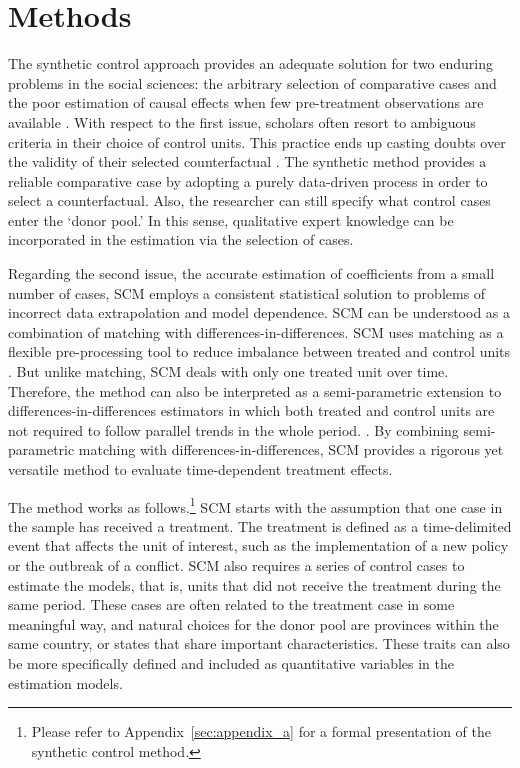 \section{Methods}
\label{sec:methods}

The synthetic control approach provides an adequate solution for two enduring problems in the social sciences: the arbitrary selection of comparative cases and the poor estimation of causal effects when few pre-treatment observations are available \citep{abadie2003, abadie2010}. With respect to the first issue, scholars often resort to ambiguous criteria in their choice of control units. This practice ends up casting doubts over the validity of their selected counterfactual \citep{abadie2011}. The synthetic method provides a reliable comparative case by adopting a purely data-driven process in order to select a counterfactual. Also, the researcher can still specify what control cases enter the `donor pool.' In this sense, qualitative expert knowledge can be incorporated in the estimation via the selection of cases. 

Regarding the second issue, the accurate estimation of coefficients from a small number of cases, SCM employs a consistent statistical solution to problems of incorrect data extrapolation and model dependence. SCM can be understood as a combination of matching with differences-in-differences. SCM uses matching as a flexible pre-processing tool to reduce imbalance between treated and control units \citep{ho2007matching, rubin1973matching, rubin2006matched}. But unlike matching, SCM deals with only one treated unit over time. Therefore, the method can also be interpreted as a semi-parametric extension to differences-in-differences estimators in which both treated and control units are not required to follow parallel trends in the whole period. \citep{abadie2005semiparametric}. By combining semi-parametric matching with differences-in-differences, SCM provides a rigorous yet versatile method to evaluate time-dependent treatment effects. 

The method works as follows.\footnote{Please refer to Appendix~\ref{sec:appendix_a} for a formal presentation of the synthetic control method.} SCM starts with the assumption that one case in the sample has received a treatment. The treatment is defined as a time-delimited event that affects the unit of interest, such as the implementation of a new policy or the outbreak of a conflict. SCM also requires a series of control cases to estimate the models, that is, units that did not receive the treatment during the same period. These cases are often related to the treatment case in some meaningful way, and natural choices for the donor pool are provinces within the same country, or states that share important characteristics. These traits can also be more specifically defined and included as quantitative variables in the estimation models. 

